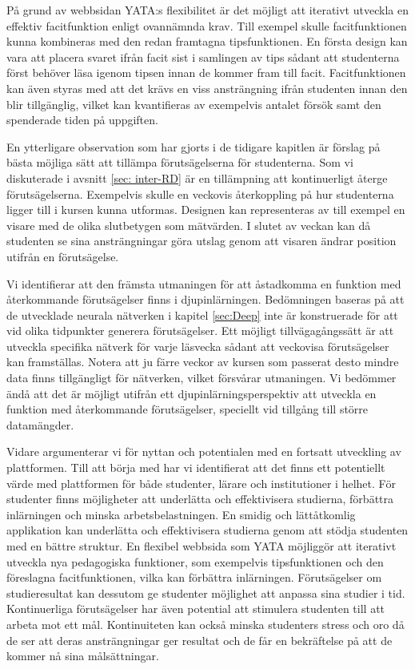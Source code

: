 På grund av webbsidan YATA:s flexibilitet är det möjligt att iterativt utveckla en effektiv facitfunktion enligt ovannämnda krav. Till exempel skulle facitfunktionen kunna kombineras med den redan framtagna tipsfunktionen. En första design kan vara att placera svaret ifrån facit sist i samlingen av tips sådant att studenterna först behöver läsa igenom tipsen innan de kommer fram till facit. Facitfunktionen kan även styras med att det krävs en viss ansträngning ifrån studenten innan den blir tillgänglig, vilket kan kvantifieras av exempelvis antalet försök samt den spenderade tiden på uppgiften.

En ytterligare observation som har gjorts i de tidigare kapitlen är förslag på bästa möjliga sätt att tillämpa förutsägelserna för studenterna. Som vi diskuterade i avsnitt \ref{sec: inter-RD} är en tillämpning att kontinuerligt återge förutsägelserna. Exempelvis skulle en veckovis återkoppling på hur studenterna ligger till i kursen kunna utformas. Designen kan representeras av till exempel en visare med de olika slutbetygen som mätvärden. I slutet av veckan kan då studenten se sina ansträngningar göra utslag genom att visaren ändrar position utifrån en förutsägelse. 

Vi identifierar att den främsta utmaningen för att åstadkomma en funktion med återkommande förutsägelser finns i djupinlärningen. Bedömningen baseras på att de utvecklade neurala nätverken i kapitel \ref{sec:Deep} inte är konstruerade för att vid olika tidpunkter generera förutsägelser. Ett möjligt tillvägagångssätt är att utveckla specifika nätverk för varje läsvecka sådant att veckovisa förutsägelser kan framställas. Notera att ju färre veckor av kursen som passerat desto mindre data finns tillgängligt för nätverken, vilket försvårar utmaningen. Vi bedömmer ändå att det är möjligt utifrån ett djupinlärningsperspektiv att utveckla en funktion med återkommande förutsägelser, speciellt vid tillgång till större datamängder.

Vidare argumenterar vi för nyttan och potentialen med en fortsatt utveckling av plattformen. Till att börja med har vi identifierat att det finns ett potentiellt värde med plattformen för både studenter, lärare och institutioner i helhet. För studenter finns möjligheter att underlätta och effektivisera studierna, förbättra inlärningen och minska arbetsbelastningen. En smidig och lättåtkomlig applikation kan underlätta och effektivisera studierna genom att stödja studenten med en bättre struktur. En flexibel webbsida som YATA möjliggör att iterativt utveckla nya pedagogiska funktioner, som exempelvis tipsfunktionen och den föreslagna facitfunktionen, vilka kan förbättra inlärningen. Förutsägelser om studieresultat kan dessutom ge studenter möjlighet att anpassa sina studier i tid. Kontinuerliga förutsägelser har även potential att stimulera studenten till att arbeta mot ett mål. Kontinuiteten kan också minska studenters stress och oro då de ser att deras ansträngningar ger resultat och de får en bekräftelse på att de kommer nå sina målsättningar. 

